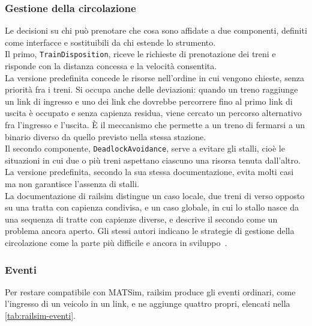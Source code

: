 \subsubsection{Gestione della circolazione}
Le decisioni su chi può prenotare che cosa sono affidate a due componenti, definiti come interfacce e sostituibili da chi estende lo strumento. \\
Il primo, \texttt{TrainDisposition}, riceve le richieste di prenotazione dei treni e risponde con la distanza concessa e la velocità consentita. \\
La versione predefinita concede le risorse nell'ordine in cui vengono chieste, senza priorità fra i treni. Si occupa anche delle deviazioni: quando un treno raggiunge un link di ingresso e uno dei link che dovrebbe percorrere fino al primo link di uscita è occupato e senza capienza residua, viene cercato un percorso alternativo fra l'ingresso e l'uscita. È il meccanismo che permette a un treno di fermarsi a un binario diverso da quello previsto nella stessa stazione.\\
Il secondo componente, \texttt{DeadlockAvoidance}, serve a evitare gli stalli, cioè le situazioni in cui due o più treni aspettano ciascuno una risorsa tenuta dall'altro. La versione predefinita, secondo la sua stessa documentazione, evita molti casi ma non garantisce l'assenza di stalli. \\
La documentazione di railsim distingue un caso locale, due treni di verso opposto su una tratta con capienza condivisa, e un caso globale, in cui lo stallo nasce da una sequenza di tratte con capienze diverse, e descrive il secondo come un problema ancora aperto. Gli stessi autori indicano le strategie di gestione della circolazione come la parte più difficile e ancora in sviluppo~\cite{kaddoura2024railsim}.

\subsubsection{Eventi}
Per restare compatibile con MATSim, railsim produce gli eventi ordinari, come l'ingresso di un veicolo in un link, e ne aggiunge quattro propri, elencati nella \cref{tab:railsim-eventi}.

